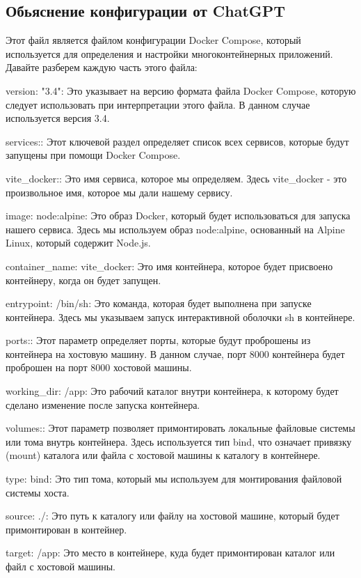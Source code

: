 \documentclass[14pt, a4paper]{extarticle}
\begin{document}
\subsection{Обьяснение конфигурации от ChatGPT}

Этот файл является файлом конфигурации Docker Compose, который используется для определения и настройки многоконтейнерных приложений. Давайте разберем каждую часть этого файла:

version: "3.4": Это указывает на версию формата файла Docker Compose, которую следует использовать при интерпретации этого файла. В данном случае используется версия 3.4.

services:: Этот ключевой раздел определяет список всех сервисов, которые будут запущены при помощи Docker Compose.

vite\_docker:: Это имя сервиса, которое мы определяем. Здесь vite\_docker - это произвольное имя, которое мы дали нашему сервису.

image: node:alpine: Это образ Docker, который будет использоваться для запуска нашего сервиса. Здесь мы используем образ node:alpine, основанный на Alpine Linux, который содержит Node.js.

container\_name: vite\_docker: Это имя контейнера, которое будет присвоено контейнеру, когда он будет запущен.

entrypoint: /bin/sh: Это команда, которая будет выполнена при запуске контейнера. Здесь мы указываем запуск интерактивной оболочки sh в контейнере.

ports:: Этот параметр определяет порты, которые будут проброшены из контейнера на хостовую машину. В данном случае, порт 8000 контейнера будет проброшен на порт 8000 хостовой машины.

working\_dir: /app: Это рабочий каталог внутри контейнера, к которому будет сделано изменение после запуска контейнера.

volumes:: Этот параметр позволяет примонтировать локальные файловые системы или тома внутрь контейнера. Здесь используется тип bind, что означает привязку (mount) каталога или файла с хостовой машины к каталогу в контейнере.

type: bind: Это тип тома, который мы используем для монтирования файловой системы хоста.

source: ./: Это путь к каталогу или файлу на хостовой машине, который будет примонтирован в контейнер.

target: /app: Это место в контейнере, куда будет примонтирован каталог или файл с хостовой машины.
\end{document}
